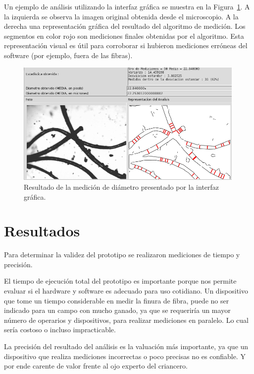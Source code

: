 \documentclass[runningheads,a4paper]{llncs}
\begin{document}
Un ejemplo de análisis utilizando la interfaz gráfica se muestra en la Figura~\ref{fig:captura3}.
A la izquierda se observa la imagen original obtenida desde el microscopio. A la derecha una representación gráfica del resultado del algoritmo de medición. Los segmentos en color rojo son mediciones finales obtenidas por el algoritmo. Esta representación visual es útil para corroborar si hubieron mediciones erróneas del software (por ejemplo, fuera de las fibras).
\begin{figure}
\centering
\includegraphics[height=6cm]{captura3}
\caption{Resultado de la medición de diámetro presentado por la interfaz gráfica.}
\label{fig:captura3}
\end{figure}


\section{Resultados}\label{sec:res}

Para determinar la validez del prototipo se realizaron mediciones de tiempo y precisión.

El tiempo de ejecución total del prototipo es importante porque nos permite evaluar si el hardware y software es adecuado para uso cotidiano. Un dispositivo que tome un tiempo considerable en medir la finura de fibra, puede no ser indicado para un campo con mucho ganado, ya que se requeriría un mayor número de operarios y dispositivos, para realizar mediciones en paralelo. Lo cual sería costoso o incluso impracticable.

La precisión del resultado del análisis es la valuación más importante, ya que un dispositivo que realiza mediciones incorrectas o poco precisas no es confiable. Y por ende carente de valor frente al ojo experto del criancero. 
\end{document}
